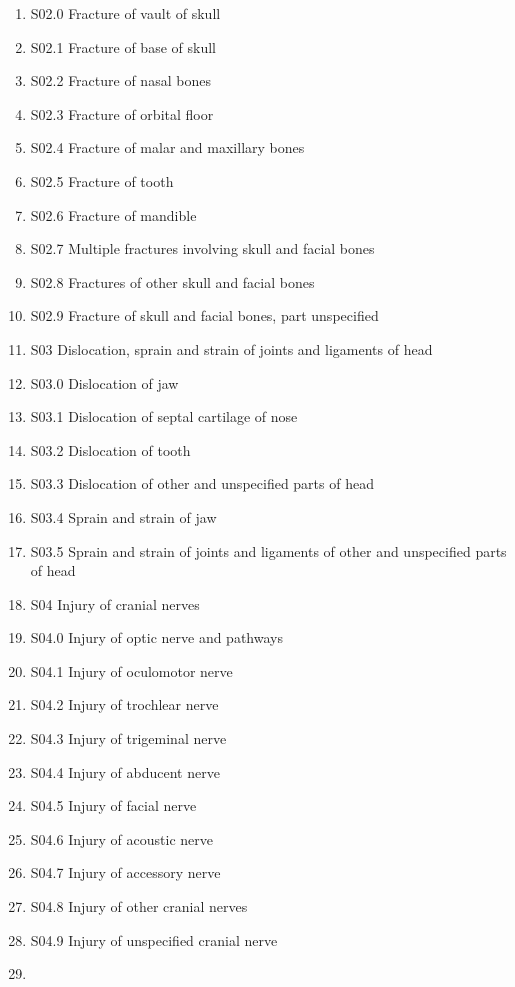 \documentclass[
]{scrartcl}
\begin{document}
\begin{itemize}
\begin{enumerate}
  \item
    S02.0 Fracture of vault of skull
  \item
    S02.1 Fracture of base of skull
  \item
    S02.2 Fracture of nasal bones
  \item
    S02.3 Fracture of orbital floor
  \item
    S02.4 Fracture of malar and maxillary bones
  \item
    S02.5 Fracture of tooth
  \item
    S02.6 Fracture of mandible
  \item
    S02.7 Multiple fractures involving skull and facial bones
  \item
    S02.8 Fractures of other skull and facial bones
  \item
    S02.9 Fracture of skull and facial bones, part unspecified
  \item
    S03 Dislocation, sprain and strain of joints and ligaments of head
  \item
    S03.0 Dislocation of jaw
  \item
    S03.1 Dislocation of septal cartilage of nose
  \item
    S03.2 Dislocation of tooth
  \item
    S03.3 Dislocation of other and unspecified parts of head
  \item
    S03.4 Sprain and strain of jaw
  \item
    S03.5 Sprain and strain of joints and ligaments of other and
    unspecified parts of head
  \item
    S04 Injury of cranial nerves
  \item
    S04.0 Injury of optic nerve and pathways
  \item
    S04.1 Injury of oculomotor nerve
  \item
    S04.2 Injury of trochlear nerve
  \item
    S04.3 Injury of trigeminal nerve
  \item
    S04.4 Injury of abducent nerve
  \item
    S04.5 Injury of facial nerve
  \item
    S04.6 Injury of acoustic nerve
  \item
    S04.7 Injury of accessory nerve
  \item
    S04.8 Injury of other cranial nerves
  \item
    S04.9 Injury of unspecified cranial nerve
  \item

\end{enumerate}
\end{itemize}
\end{document}
